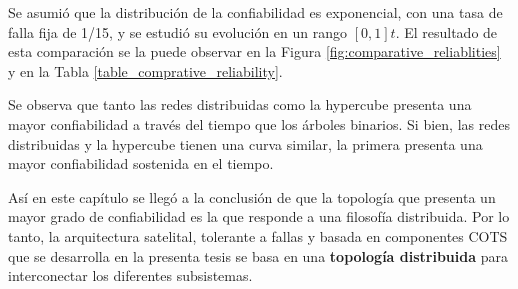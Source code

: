 Se asumió que la distribución de la confiabilidad es exponencial, con una tasa de falla fija de 1/15, y se estudió su evolución en un rango $[0,1]t$. El resultado de esta comparación se la puede observar en la Figura \ref{fig:comparative_reliablities} y en la Tabla \ref{table_comprative_reliability}.

Se observa que tanto las redes distribuidas como la hypercube presenta una mayor confiabilidad a través del tiempo que  los árboles binarios. Si bien, las redes distribuidas y la hypercube tienen una curva similar, la primera presenta una mayor confiabilidad sostenida en el tiempo.

Así en este capítulo se llegó a la conclusión de que la topología que presenta un mayor grado de
confiabilidad es la que responde a una filosofía distribuida.  Por lo tanto, la arquitectura satelital, tolerante a fallas y basada en componentes COTS que se desarrolla en la presenta tesis se basa en una \textbf{topología distribuida} para interconectar los diferentes subsistemas.
